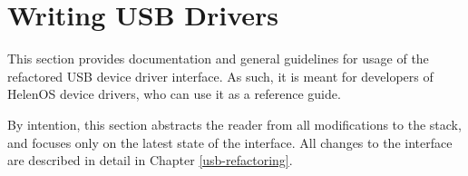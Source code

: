 \chapter{Writing USB Drivers}

This section provides documentation and general guidelines for usage of the
refactored USB device driver interface. As such, it is meant for developers of
HelenOS device drivers, who can use it as a reference guide.

By intention, this section abstracts the reader from all modifications to the
stack, and focuses only on the latest state of the interface. All changes to the
interface are described in detail in Chapter \ref{usb-refactoring}.


